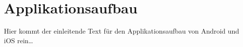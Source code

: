 \section{Applikationsaufbau}
	Hier kommt der einleitende Text für den Applikationsaufbau von Android und iOS
	rein\ldots
